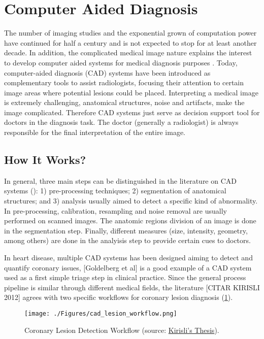\section{Computer Aided Diagnosis}

The number of imaging studies and the exponential grown of computation power have continued for half a century and is not expected to stop for at least another decade. In addition, the complicated medical image nature explains the interest to develop computer aided systems for medical diagnosis purposes \citep{Ginneken2011}.
Today, computer-aided diagnosis (CAD) systems have been introduced as complementary tools to assist radiologists, focusing their attention to certain image areas where potential lesions could be placed. Interpreting a medical image is extremely challenging, anatomical structures, noise and artifacts, make the image complicated. Therefore CAD systems just serve as decision support tool for doctors in the diagnosis task. The doctor (generally a radiologist) is always responsible for the final interpretation of the entire image.

\subsection{How It Works?}

In general, three main steps can be distinguished in the literature on CAD systems (\citep{Ginneken2001}): 1) pre-processing techniques; 2) segmentation of anatomical structures; and 3) analysis usually aimed to detect a specific kind of abnormality. In pre-processing, calibration, resampling and noise removal are usually performed on scanned images. The anatomic regions division of an image is done in the segmentation step. Finally, different measures (size, intensity, geometry, among others) are done in the analyisis step to provide certain cues to doctors.

In heart disease, multiple CAD systems has been designed aiming to detect and quantify coronary issues, [Goldelberg et al] is a good example of a CAD system used as a first simple triage step in clinical practice. Since the general process pipeline is similar through different medical fields, the literature [CITAR KIRISLI 2012] agrees with two specific workflows for coronary lesion diagnosis (\ref{fig:cad_wf}).

\begin{figure}[htbp]
	\centering
		\texttt{[image: ./Figures/cad\_lesion\_workflow.png]}
	\caption[Coronary Lesion Detection Workflow]{Coronary Lesion Detection Workflow (source: \href{http://www.bigr.nl/publication/880}{Kirisli's Thesis}).}
	\label{fig:cad_wf}
\end{figure}

